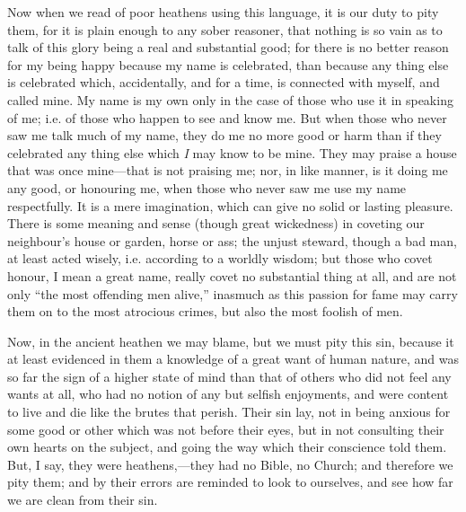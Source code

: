 Now when we read of poor heathens using this language, it is our
duty to pity them, for it is plain enough to any sober reasoner, that
nothing is so vain as to talk of this glory being a real and
substantial good; for there is no better reason for my being happy
because my name is celebrated, than because any thing else is
celebrated which, accidentally, and for a time, is connected with
myself, and called mine. My name is my own only in the case of those
who use it in speaking of me; i.e. of those who happen to see and know
me. But when those who never saw me talk much of my name, they do me
no more good or harm than if they celebrated any thing else which \emph{I}
may know to be mine. They may praise a house that was once mine—that
is not praising me; nor, in like manner, is it doing me any good, or
honouring me, when those who never saw me use my name respectfully. It
is a mere imagination, which can give no solid or lasting pleasure.
There is some meaning and sense (though great wickedness) in coveting
our neighbour's house or garden, horse or ass; the unjust steward,
though a bad man, at least acted wisely, i.e. according to a worldly
wisdom; but those who covet honour, I mean a great name, really covet
no substantial thing at all, and are not only ``the most offending
men alive,'' inasmuch as this passion for fame may carry them on
to the most atrocious crimes, but also the most foolish of men.

Now, in the ancient heathen we may blame, but we must pity this
sin, because it at least evidenced in them a knowledge of a great want
of human nature, and was so far the sign of a higher state of mind
than that of others who did not feel any wants at all, who had no
notion of any but selfish enjoyments, and were content to live and die
like the brutes that perish. Their sin lay, not in being anxious for
some good or other which was not before their eyes, but in not
consulting their own hearts on the subject, and going the way which
their conscience told them. But, I say, they were heathens,—they had
no Bible, no Church; and therefore we pity them; and by their errors
are reminded to look to ourselves, and see how far we are clean from
their sin.

